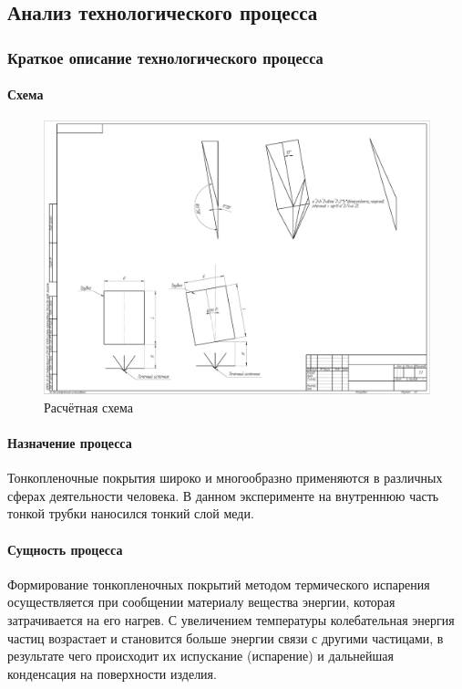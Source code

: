 \documentclass[../../AISTR.tex]{subfiles}
\begin{document}
\subsection{Анализ технологического процесса}
\subsubsection{Краткое описание технологического процесса}
\paragraph{Схема}
\begin{figure}[H]
	\centering
	\includegraphics[trim=75 50 630 650,clip,width=0.9\linewidth]{Raschetnaya_Skhema_Dlya_Panfilovoy}
	\caption{Расчётная схема}
	\label{fig:raschetnayaskhemadlyapanfilovoy}
\end{figure}

\paragraph{Назначение процесса}
Тонкопленочные покрытия широко и многообразно применяются в различных сферах деятельности человека. В данном эксперименте на внутреннюю часть тонкой трубки наносился тонкий слой меди.
\paragraph{Сущность процесса}
Формирование тонкопленочных покрытий методом термического испарения осуществляется при сообщении материалу вещества энергии, которая затрачивается на его нагрев. С увеличением температуры колебательная энергия частиц возрастает и становится больше энергии связи с другими частицами, в результате чего происходит их испускание (испарение) и дальнейшая конденсация на поверхности изделия.
\end{document}
